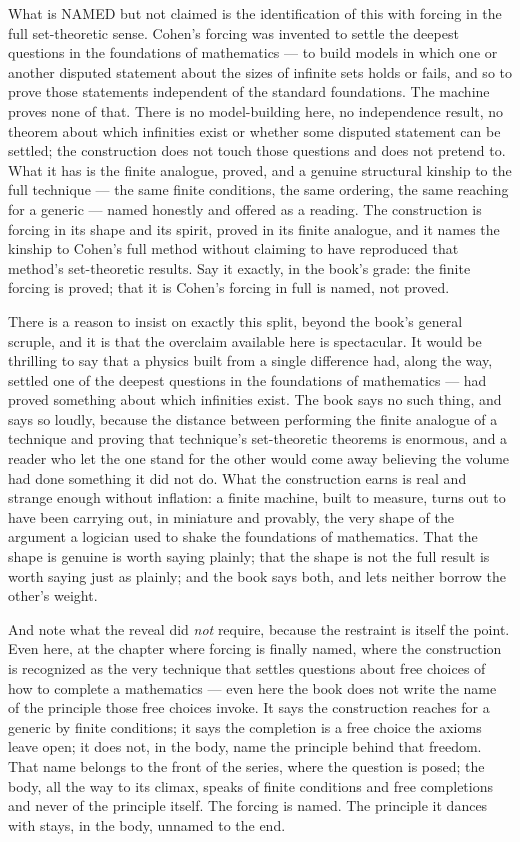 What is NAMED but not claimed is the identification of this with forcing in the full set-theoretic sense. Cohen's
forcing was invented to settle the deepest questions in the foundations of mathematics --- to build models in
which one or another disputed statement about the sizes of infinite sets holds or fails, and so to prove those
statements independent of the standard foundations. The machine proves none of that. There is no model-building
here, no independence result, no theorem about which infinities exist or whether some disputed statement can be
settled; the construction does not touch those questions and does not pretend to. What it has is the finite
analogue, proved, and a genuine structural kinship to the full technique --- the same finite conditions, the same
ordering, the same reaching for a generic --- named honestly and offered as a reading. The construction is forcing
in its shape and its spirit, proved in its finite analogue, and it names the kinship to Cohen's full method
without claiming to have reproduced that method's set-theoretic results. Say it exactly, in the book's grade: the
finite forcing is proved; that it is Cohen's forcing in full is named, not proved.

There is a reason to insist on exactly this split, beyond the book's general scruple, and it is that the overclaim
available here is spectacular. It would be thrilling to say that a physics built from a single difference had,
along the way, settled one of the deepest questions in the foundations of mathematics --- had proved something
about which infinities exist. The book says no such thing, and says so loudly, because the distance between
performing the finite analogue of a technique and proving that technique's set-theoretic theorems is enormous, and
a reader who let the one stand for the other would come away believing the volume had done something it did not
do. What the construction earns is real and strange enough without inflation: a finite machine, built to measure,
turns out to have been carrying out, in miniature and provably, the very shape of the argument a logician used to
shake the foundations of mathematics. That the shape is genuine is worth saying plainly; that the shape is not the
full result is worth saying just as plainly; and the book says both, and lets neither borrow the other's weight.

And note what the reveal did \emph{not} require, because the restraint is itself the point. Even here, at the
chapter where forcing is finally named, where the construction is recognized as the very technique that settles
questions about free choices of how to complete a mathematics --- even here the book does not write the name of
the principle those free choices invoke. It says the construction reaches for a generic by finite conditions; it
says the completion is a free choice the axioms leave open; it does not, in the body, name the principle behind
that freedom. That name belongs to the front of the series, where the question is posed; the body, all the way to
its climax, speaks of finite conditions and free completions and never of the principle itself. The forcing is
named. The principle it dances with stays, in the body, unnamed to the end.

